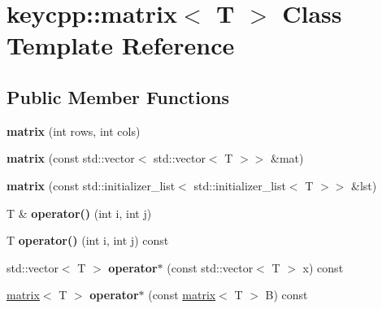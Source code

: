 \hypertarget{classkeycpp_1_1matrix}{\section{keycpp\-:\-:matrix$<$ T $>$ Class Template Reference}
\label{classkeycpp_1_1matrix}
}
\subsection*{Public Member Functions}
\begin{DoxyCompactItemize}
\item 
\hypertarget{classkeycpp_1_1matrix_accfc7cf9173d98b383c57af63f669b94}{{\bfseries matrix} (int rows, int cols)}\label{classkeycpp_1_1matrix_accfc7cf9173d98b383c57af63f669b94}

\item 
\hypertarget{classkeycpp_1_1matrix_ad843813ecfec7c08b9259957406e94e2}{{\bfseries matrix} (const std\-::vector$<$ std\-::vector$<$ T $>$$>$ \&mat)}\label{classkeycpp_1_1matrix_ad843813ecfec7c08b9259957406e94e2}

\item 
\hypertarget{classkeycpp_1_1matrix_ad8797411bc30cc0d42e0e9b8bcc899d7}{{\bfseries matrix} (const std\-::initializer\-\_\-list$<$ std\-::initializer\-\_\-list$<$ T $>$$>$ \&lst)}\label{classkeycpp_1_1matrix_ad8797411bc30cc0d42e0e9b8bcc899d7}

\item 
\hypertarget{classkeycpp_1_1matrix_a802052b0519a3b20d5a38f84a6832a79}{T \& {\bfseries operator()} (int i, int j)}\label{classkeycpp_1_1matrix_a802052b0519a3b20d5a38f84a6832a79}

\item 
\hypertarget{classkeycpp_1_1matrix_a951ea6752f4fb04e275a04be3539420a}{T {\bfseries operator()} (int i, int j) const }\label{classkeycpp_1_1matrix_a951ea6752f4fb04e275a04be3539420a}

\item 
\hypertarget{classkeycpp_1_1matrix_a78ad6107ab3b9546b20021274fe0ab47}{std\-::vector$<$ T $>$ {\bfseries operator$\ast$} (const std\-::vector$<$ T $>$ x) const }\label{classkeycpp_1_1matrix_a78ad6107ab3b9546b20021274fe0ab47}

\item 
\hypertarget{classkeycpp_1_1matrix_aa5a29b33cfa0d9568b90726fdef372f9}{\hyperlink{classkeycpp_1_1matrix}{matrix}$<$ T $>$ {\bfseries operator$\ast$} (const \hyperlink{classkeycpp_1_1matrix}{matrix}$<$ T $>$ B) const }\label{classkeycpp_1_1matrix_aa5a29b33cfa0d9568b90726fdef372f9}


\end{DoxyCompactItemize}
